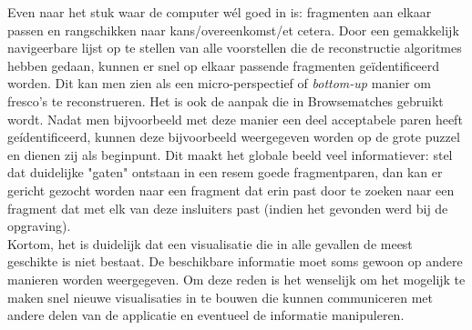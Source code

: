 Even naar het stuk waar de computer w\'el goed in is: fragmenten aan elkaar passen en rangschikken naar kans/overeenkomst/et cetera. Door een gemakkelijk navigeerbare lijst op te stellen van alle voorstellen die de reconstructie algoritmes hebben gedaan, kunnen er snel op elkaar passende fragmenten ge\"identificeerd worden. Dit kan men zien als een micro-perspectief of \emph{bottom-up} manier om fresco's te reconstrueren. Het is ook de aanpak die in Browsematches gebruikt wordt. Nadat men bijvoorbeeld met deze manier een deel acceptabele paren heeft ge\'identificeerd, kunnen deze bijvoorbeeld weergegeven worden op de grote puzzel en dienen zij als beginpunt. Dit maakt het globale beeld veel informatiever: stel dat duidelijke "gaten" ontstaan in een resem goede fragmentparen, dan kan er gericht gezocht worden naar een fragment dat erin past door te zoeken naar een fragment dat met elk van deze insluiters past (indien het gevonden werd bij de opgraving).\\

Kortom, het is duidelijk dat een visualisatie die in alle gevallen de meest geschikte is niet bestaat. De beschikbare informatie moet soms gewoon op andere manieren worden weergegeven. Om deze reden is het wenselijk om het mogelijk te maken snel nieuwe visualisaties in te bouwen die kunnen communiceren met andere delen van de applicatie en eventueel de informatie manipuleren. 